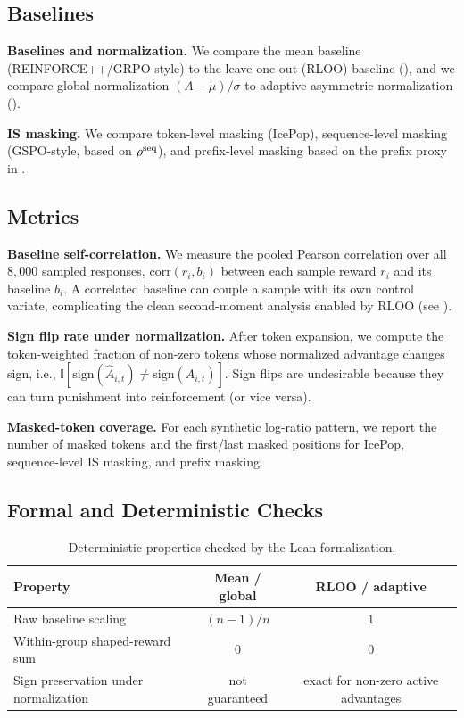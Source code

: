 \subsection{Baselines}

\textbf{Baselines and normalization.} We compare the mean baseline (REINFORCE++/GRPO-style) to the leave-one-out (RLOO) baseline (), and we compare global normalization $(A-\mu)/\sigma$ to adaptive asymmetric normalization ().

\textbf{IS masking.} We compare token-level masking (IcePop), sequence-level masking (GSPO-style, based on $\rho^{\mathrm{seq}}$), and prefix-level
masking based on the prefix proxy in .

\subsection{Metrics}

\textbf{Baseline self-correlation.} We measure the pooled Pearson correlation over all $8{,}000$ sampled responses, $\mathrm{corr}(r_i, b_i)$ between each sample reward $r_i$ and its baseline $b_i$. A
correlated baseline can couple a sample with its own control variate, complicating the clean second-moment analysis enabled by RLOO (see
).

\textbf{Sign flip rate under normalization.} After token expansion, we compute the token-weighted fraction of non-zero tokens whose normalized advantage changes sign, i.e., $\mathbb{I}[\mathrm{sign}(\hat{A}_{i,t}) \neq \mathrm{sign}(A_{i,t})]$. Sign flips are undesirable because they can turn punishment into reinforcement (or vice versa).

\textbf{Masked-token coverage.} For each synthetic log-ratio pattern, we report the number of masked tokens and the first/last masked
positions for IcePop, sequence-level IS masking, and prefix masking.

\subsection{Formal and Deterministic Checks}

\begin{table}[ht]
\centering
\caption{Deterministic properties checked by the Lean formalization.}
\renewcommand{\arraystretch}{1.2}
\small
\begin{tabular}{lcc}
\toprule
\textbf{Property} & \textbf{Mean / global} & \textbf{RLOO / adaptive} \\
\midrule
Raw baseline scaling & $(n-1)/n$ & $1$ \\
Within-group shaped-reward sum & $0$ & $0$ \\
Sign preservation under normalization & not guaranteed & exact for non-zero active advantages \\
\bottomrule
\end{tabular}
\end{table}

